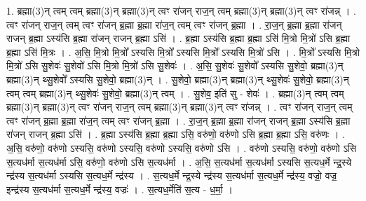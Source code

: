 \documentclass[17pt]{extarticle}
\begin{document}
1. ब्रह्मा(3)न् त्वम् त्वम् ब्रह्मा(3)न् ब्रह्मा(3)न् त्वꣳ रा॑जन् राज॒न् त्वम् ब्रह्मा(3)न् ब्रह्मा(3)न् त्वꣳ रा॑जन्न् । . त्वꣳ रा॑जन् राज॒न् त्वम् त्वꣳ रा॑जन् ब्र॒ह्मा ब्र॒ह्मा रा॑ज॒न् त्वम् त्वꣳ रा॑जन् ब्र॒ह्मा । . रा॒ज॒न् ब्र॒ह्मा ब्र॒ह्मा रा॑जन् राजन् ब्र॒ह्मा ऽस्य॑सि ब्र॒ह्मा रा॑जन् राजन् ब्र॒ह्मा ऽसि॑ । . ब्र॒ह्मा ऽस्य॑सि ब्र॒ह्मा ब्र॒ह्मा ऽसि॑ मि॒त्रो मि॒त्रो॑ ऽसि ब्र॒ह्मा ब्र॒ह्मा ऽसि॑ मि॒त्रः । . अ॒सि॒ मि॒त्रो मि॒त्रो᳚ ऽस्यसि मि॒त्रो᳚ ऽस्यसि मि॒त्रो᳚ ऽस्यसि मि॒त्रो॑ ऽसि । . मि॒त्रो᳚ ऽस्यसि मि॒त्रो मि॒त्रो॑ ऽसि सु॒शेवः॑ सु॒शेवो॑ ऽसि मि॒त्रो मि॒त्रो॑ ऽसि सु॒शेवः॑ । . अ॒सि॒ सु॒शेवः॑ सु॒शेवो᳚ ऽस्यसि सु॒शेवो॒ ब्रह्मा(3)न् ब्रह्मा(3)न् थ्सु॒शेवो᳚ ऽस्यसि सु॒शेवो॒ ब्रह्मा(3)न् । . सु॒शेवो॒ ब्रह्मा(3)न् ब्रह्मा(3)न् थ्सु॒शेवः॑ सु॒शेवो॒ ब्रह्मा(3)न् त्वम् त्वम् ब्रह्मा(3)न् थ्सु॒शेवः॑ सु॒शेवो॒ ब्रह्मा(3)न् त्वम् । . सु॒शेव॒ इति॑ सु - शेवः॑ । . ब्रह्मा(3)न् त्वम् त्वम् ब्रह्मा(3)न् ब्रह्मा(3)न् त्वꣳ रा॑जन् राज॒न् त्वम् ब्रह्मा(3)न् ब्रह्मा(3)न् त्वꣳ रा॑जन्न् । . त्वꣳ रा॑जन् राज॒न् त्वम् त्वꣳ रा॑जन् ब्र॒ह्मा ब्र॒ह्मा रा॑ज॒न् त्वम् त्वꣳ रा॑जन् ब्र॒ह्मा । . रा॒ज॒न् ब्र॒ह्मा ब्र॒ह्मा रा॑जन् राजन् ब्र॒ह्मा ऽस्य॑सि ब्र॒ह्मा रा॑जन् राजन् ब्र॒ह्मा ऽसि॑ । . ब्र॒ह्मा ऽस्य॑सि ब्र॒ह्मा ब्र॒ह्मा ऽसि॒ वरु॑णो॒ वरु॑णो ऽसि ब्र॒ह्मा ब्र॒ह्मा ऽसि॒ वरु॑णः । . अ॒सि॒ वरु॑णो॒ वरु॑णो ऽस्यसि॒ वरु॑णो ऽस्यसि॒ वरु॑णो ऽस्यसि॒ वरु॑णो ऽसि । . वरु॑णो ऽस्यसि॒ वरु॑णो॒ वरु॑णो ऽसि स॒त्यध॑र्मा स॒त्यध॑र्मा ऽसि॒ वरु॑णो॒ वरु॑णो ऽसि स॒त्यध॑र्मा । . अ॒सि॒ स॒त्यध॑र्मा स॒त्यध॑र्मा ऽस्यसि स॒त्यध॒र्मे न्द्र॒स्ये न्द्र॑स्य स॒त्यध॑र्मा ऽस्यसि स॒त्यध॒र्मे न्द्र॑स्य । . स॒त्यध॒र्मे न्द्र॒स्ये न्द्र॑स्य स॒त्यध॑र्मा स॒त्यध॒र्मे न्द्र॑स्य॒ वज्रो॒ वज्र॒ इन्द्र॑स्य स॒त्यध॑र्मा 
स॒त्यध॒र्मे न्द्र॑स्य॒ वज्रः॑ । . स॒त्यध॒र्मेति॑ स॒त्य - ध॒र्मा॒ । \newline
\end{document}
